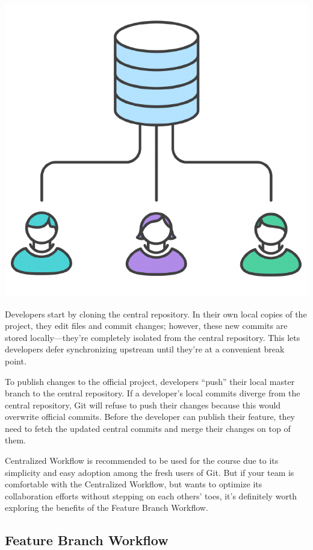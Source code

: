 \documentclass{article}
\begin{document}
\begin{center}
\includegraphics[scale=0.5]{figures/12.pdf}
\end{center}

Developers start by cloning the central repository. In their own local
copies of the project, they edit files and commit changes; however,
these new commits are stored locally—they're 
completely isolated from the central repository. This lets developers
defer synchronizing upstream until they're at a convenient break
point.

To publish changes to the official project, developers ``push'' their
local master branch to the central repository. 
If a developer's local commits diverge from the central repository,
Git will refuse to push their changes because this would overwrite
official commits. Before the developer can publish their feature, they
need to fetch the updated central commits and merge their changes on
top of them.

Centralized Workflow is recommended to be used for the course due to 
its simplicity and easy adoption among the fresh users of Git.
But if your team is comfortable with the Centralized Workflow, but wants to
optimize its collaboration efforts without stepping on each others'
toes, it's definitely worth exploring the benefits of the Feature
Branch Workflow.


\subsection{Feature Branch Workflow}
\end{document}
